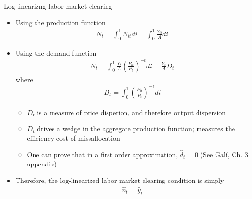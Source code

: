 \documentclass[9pt,xcolor={dvipsnames}]{beamer}
\newcommand{\bit}{\begin{itemize}}
\newcommand{\eit}{\end{itemize}}
\newcommand{\bc}{\color{blue}}
\begin{document}
\begin{frame}{Log-linearizng labor market clearing}

\bit
\setlength\itemsep{1.5em}

\item Using the production function
\begin{eqnarray}
N_t =\int_{0}^{1} N_{it} di  = \int_{0}^{1} \frac{Y_{it}}{A} di  \nonumber
\end{eqnarray}

\item Using the demand function
\begin{eqnarray}
N_t = \int_{0}^{1} \frac{Y_{t}}{A}\left(\frac{P_{it}}{P_t} \right)^{-\epsilon} di  = \frac{Y_{t}}{A} D_t \nonumber
\end{eqnarray}
where 
\begin{eqnarray}
D_t = \int_{0}^{1} \left(\frac{P_{it}}{P_t} \right)^{-\epsilon}di \nonumber
\end{eqnarray}
\bit
\setlength\itemsep{0.5em}
\item $D_t$ is a measure of price disperion, and therefore output dispersion

\item $D_t$ drives a wedge in the aggregate production function; measures the efficiency cost of {\bc missallocation}

\item One can prove that in a first order approximation, $\hat d_t = 0$ (See Gal\'{i}, Ch. 3 appendix)
\eit

\item Therefore, the log-linearized labor market clearing condition is simply
\begin{eqnarray}
\hat n_t = \hat y_t \nonumber
\end{eqnarray}
\eit

\end{frame}
\end{document}
